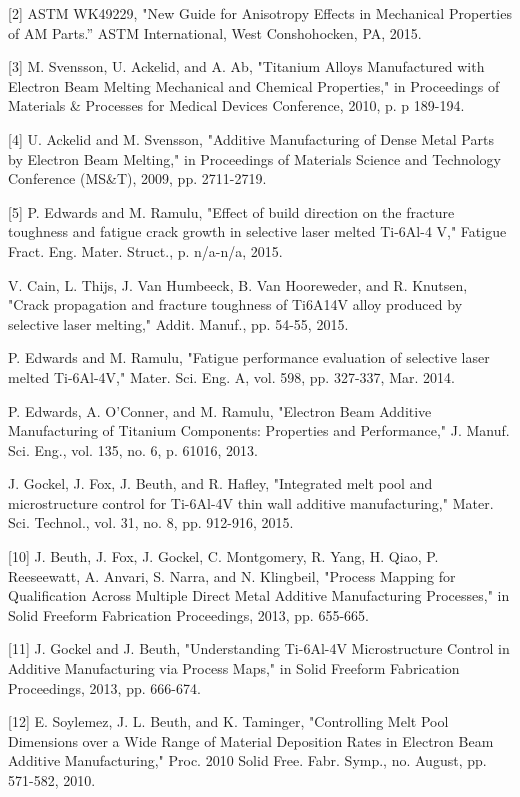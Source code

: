 \documentclass[10pt]{article}
\begin{document}
[2] ASTM WK49229, "New Guide for Anisotropy Effects in Mechanical Properties of AM Parts.” ASTM International, West Conshohocken, PA, 2015.

[3] M. Svensson, U. Ackelid, and A. Ab, "Titanium Alloys Manufactured with Electron Beam Melting Mechanical and Chemical Properties," in Proceedings of Materials \& Processes for Medical Devices Conference, 2010, p. p 189-194.

[4] U. Ackelid and M. Svensson, "Additive Manufacturing of Dense Metal Parts by Electron Beam Melting," in Proceedings of Materials Science and Technology Conference (MS\&T), 2009, pp. 2711-2719.

[5] P. Edwards and M. Ramulu, "Effect of build direction on the fracture toughness and fatigue crack growth in selective laser melted Ti-6Al-4 V," Fatigue Fract. Eng. Mater. Struct., p. n/a-n/a, 2015.

V. Cain, L. Thijs, J. Van Humbeeck, B. Van Hooreweder, and R. Knutsen, "Crack propagation and fracture toughness of Ti6A14V alloy produced by selective laser melting," Addit. Manuf., pp. 54-55, 2015.

P. Edwards and M. Ramulu, "Fatigue performance evaluation of selective laser melted Ti-6Al-4V," Mater. Sci. Eng. A, vol. 598, pp. 327-337, Mar. 2014.

P. Edwards, A. O'Conner, and M. Ramulu, "Electron Beam Additive Manufacturing of Titanium Components: Properties and Performance," J. Manuf. Sci. Eng., vol. 135, no. 6, p. 61016, 2013.

J. Gockel, J. Fox, J. Beuth, and R. Hafley, "Integrated melt pool and microstructure control for Ti-6Al-4V thin wall additive manufacturing," Mater. Sci. Technol., vol. 31, no. 8, pp. 912-916, 2015.

[10] J. Beuth, J. Fox, J. Gockel, C. Montgomery, R. Yang, H. Qiao, P. Reeseewatt, A. Anvari, S. Narra, and N. Klingbeil, "Process Mapping for Qualification Across Multiple Direct Metal Additive Manufacturing Processes," in Solid Freeform Fabrication Proceedings, 2013, pp. 655-665.

[11] J. Gockel and J. Beuth, "Understanding Ti-6Al-4V Microstructure Control in Additive Manufacturing via Process Maps," in Solid Freeform Fabrication Proceedings, 2013, pp. 666-674.

[12] E. Soylemez, J. L. Beuth, and K. Taminger, "Controlling Melt Pool Dimensions over a Wide Range of Material Deposition Rates in Electron Beam Additive Manufacturing," Proc. 2010 Solid Free. Fabr. Symp., no. August, pp. 571-582, 2010.
\end{document}
